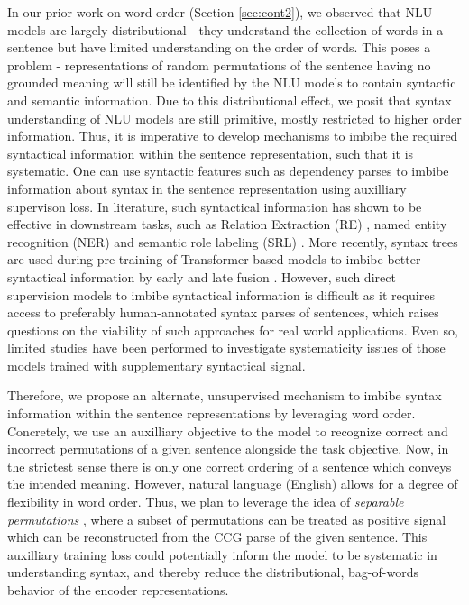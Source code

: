 \documentclass[12pt]{article}
\begin{document}
In our prior work on word order (Section \ref{sec:cont2}), we observed that NLU models are largely distributional - they understand the collection of words in a sentence but have limited understanding on the order of words. This poses a problem - representations of random permutations of the sentence having no grounded meaning will still be identified by the NLU models to contain syntactic and semantic information. Due to this distributional effect, we posit that syntax understanding of NLU models are still primitive, mostly restricted to higher order information. Thus, it is imperative to develop mechanisms to imbibe the required syntactical information within the sentence representation, such that it is systematic. One can use syntactic features such as dependency parses to imbibe information about syntax in the sentence representation using auxilliary supervison loss. In literature, such syntactical information has shown to be effective in downstream tasks, such as Relation Extraction (RE) \cite{fundel2007relex}, named entity recognition (NER) \cite{jie2019dependency} and semantic role labeling (SRL) \cite{strubell2018}. More recently, syntax trees are used during pre-training of Transformer based models to imbibe better syntactical information by early and late fusion \cite{sachan2021}. However, such direct supervision models to imbibe syntactical information is difficult as it requires access to preferably human-annotated syntax parses of sentences, which raises questions on the viability of such approaches for real world applications. Even so, limited studies have been performed to investigate systematicity issues of those models trained with supplementary syntactical signal.

Therefore, we propose an alternate, unsupervised mechanism to imbibe syntax information within the sentence representations by leveraging word order. Concretely, we use an auxilliary objective to the model to recognize correct and incorrect permutations of a given sentence alongside the task objective. Now, in the strictest sense there is only one correct ordering of a sentence which conveys the intended meaning. However, natural language (English) allows for a degree of flexibility in word order. Thus, we plan to leverage the idea of \textit{separable permutations} \cite{stanojevic2021}, where a subset of permutations can be treated as positive signal which can be reconstructed from the CCG parse of the given sentence. This auxilliary training loss could potentially inform the model to be systematic in understanding syntax, and thereby reduce the distributional, bag-of-words behavior of the encoder representations.
\end{document}

